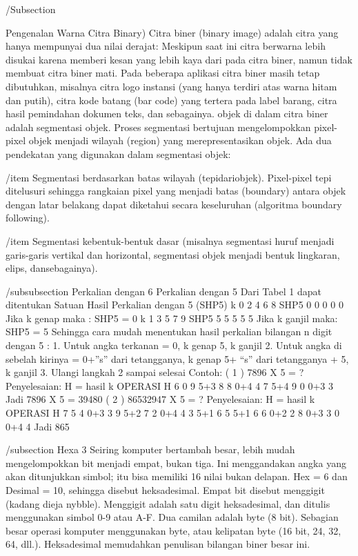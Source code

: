 /Subsection{Pengenalan Warna Citra Binary)
Citra biner (binary image) adalah citra yang hanya mempunyai dua nilai derajat: Meskipun saat ini citra berwarna lebih disukai karena memberi kesan yang lebih kaya dari pada citra biner, namun tidak membuat citra biner mati. Pada beberapa aplikasi citra biner masih tetap dibutuhkan, misalnya citra logo instansi (yang hanya terdiri atas warna hitam dan putih), citra kode batang (bar code) yang tertera pada label barang, citra hasil pemindahan dokumen teks, dan sebagainya.
objek di dalam citra biner adalah segmentasi objek. Proses segmentasi bertujuan mengelompokkan pixel-pixel objek menjadi wilayah (region) yang merepresentasikan objek. Ada dua pendekatan yang digunakan dalam segmentasi objek:

    /item Segmentasi berdasarkan batas wilayah (tepidariobjek). Pixel-pixel tepi ditelusuri sehingga rangkaian pixel yang menjadi batas     (boundary) antara objek dengan latar belakang dapat diketahui secara keseluruhan (algoritma boundary following).
    
    /item Segmentasi kebentuk-bentuk dasar (misalnya segmentasi huruf menjadi garis-garis vertikal dan horizontal, segmentasi objek          menjadi bentuk lingkaran, elips, dansebagainya).
	
	
/subsubsection {Perkalian dengan 6 Perkalian dengan 5}
Dari Tabel 1 dapat ditentukan
Satuan Hasil Perkalian dengan 5 (SHP5)
k 0 2 4 6 8
SHP5 0 0 0 0 0
Jika k genap maka :
SHP5 = 0
k 1 3 5 7 9
SHP5 5 5 5 5 5
Jika k ganjil maka:
SHP5 = 5
Sehingga cara mudah menentukan hasil
perkalian bilangan n digit dengan 5 :
1. Untuk angka terkanan = 0, k genap
5, k ganjil
2. Untuk angka di sebelah kirinya =
0+”s” dari tetangganya, k genap
5+ “s” dari tetangganya + 5, k ganjil
3. Ulangi langkah 2 sampai selesai
Contoh:
( 1 ) 7896 X 5 = ?
Penyelesaian:
H = hasil
k OPERASI H
6 0
9 5+3 8
8 0+4 4
7 5+4 9
0 0+3 3
Jadi 7896 X 5 = 39480
( 2 ) 86532947 X 5 = ?
Penyelesaian:
H = hasil
k OPERASI H
7 5
4 0+3 3
9 5+2 7
2 0+4 4
3 5+1 6
5 5+1 6
6 0+2 2
8 0+3 3
0 0+4 4
Jadi 865

/subsection {Hexa 3}
Seiring komputer bertambah besar, lebih mudah mengelompokkan bit menjadi empat, bukan tiga. Ini menggandakan 
angka yang akan ditunjukkan simbol; itu bisa memiliki 16 nilai bukan delapan. Hex = 6 dan Desimal = 10, sehingga 
disebut heksadesimal. Empat bit disebut menggigit (kadang dieja nybble). Menggigit adalah satu digit heksadesimal, 
dan ditulis menggunakan simbol 0-9 atau A-F. Dua camilan adalah byte (8 bit). Sebagian besar operasi komputer 
menggunakan byte, atau kelipatan byte (16 bit, 24, 32, 64, dll.). Heksadesimal memudahkan penulisan bilangan biner besar ini.


}
